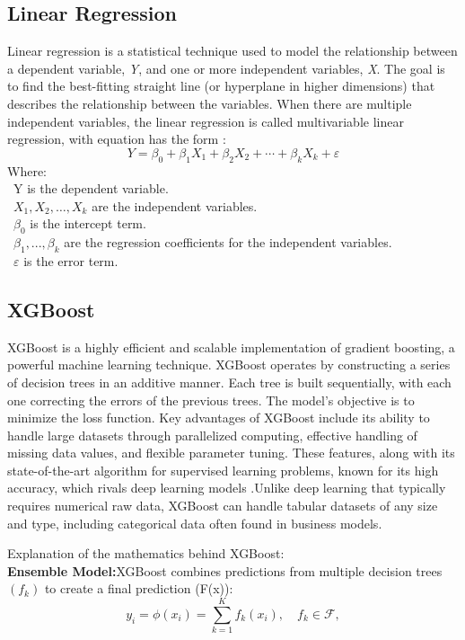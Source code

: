 \documentclass{ieeeojies}
\begin{document}
\subsection{Linear Regression}
Linear regression is a statistical technique used to model the relationship between a dependent variable, \textit{Y}, and one or more independent variables, \textit{X}. The goal is to find the best-fitting straight line (or hyperplane in higher dimensions) that describes the relationship between the variables. 
When there are multiple independent variables, the linear regression is called multivariable linear regression, with equation has the form \cite{busin}:
 \[Y=\beta_0+\beta_1X_1+\beta_2X_2+\cdots+\beta_kX_k+\varepsilon\]
Where:\\
	\indent\textbullet\ Y is the dependent variable.\\
	\indent\textbullet\ \(X_1, X_2, \ldots, X_k\) are the independent variables.\\
	\indent\textbullet\ \(\beta_0\) is the intercept term.\\
	\indent\textbullet\ \(\beta_1,..., \beta_k\) are the regression coefficients for the independent variables.\\
	\indent\textbullet\ \(\varepsilon\) is the error term.

\subsection{XGBoost}
XGBoost is a highly efficient and scalable implementation of gradient boosting, a powerful machine learning technique. XGBoost operates by constructing a series of decision trees in an additive manner. Each tree is built sequentially, with each one correcting the errors of the previous trees. The model’s objective is to minimize the loss function. Key advantages of XGBoost include its ability to handle large datasets through parallelized computing, effective handling of missing data values, and flexible parameter tuning. These features, along with its state-of-the-art algorithm for supervised learning problems, known for its high accuracy, which rivals deep learning models\cite{Xgboost} .Unlike deep learning that typically requires numerical raw data, XGBoost can handle tabular datasets of any size and type, including categorical data often found in business models.  

Explanation of the mathematics behind XGBoost:\\
\textbf{Ensemble Model:}XGBoost combines predictions from multiple decision trees $(f_k)$ to create a final prediction (F(x))\cite{Xgboost}:
\begin{equation*}
y_i = \phi(x_i) = \sum_{k=1}^K f_k(x_i), \quad f_k \in \mathcal{F},
\end{equation*}
\end{document}
